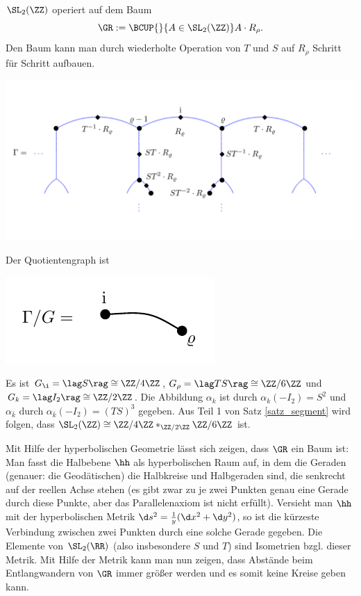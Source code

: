 \begin{enumerate}
$\SL_2(\ZZ)$ operiert auf dem Baum
\[
\GR := \BCUP{}{A\in\SL_2(\ZZ)} A\cdot R_{\rho}.
\]
Den Baum kann man durch wiederholte Operation von $T$ und $S$
auf $R_{\rho}$ Schritt für Schritt aufbauen.
\begin{center}
	\includegraphics[width=15cm]{grugraImages/Hbaum}
\end{center}
Der Quotientengraph ist
\begin{center}
	\includegraphics{grugraImages/rhoquot}
\end{center}
Es ist $G_{\i}=\lag S\rag \cong \ZZ/4\ZZ$,
$G_{\rho}=\lag TS\rag\cong \ZZ/6\ZZ$ und
$G_k=\lag I_2\rag \cong\ZZ/2\ZZ$.
Die Abbildung $\alpha_k$ ist durch $\alpha_k(-I_2)=S^2$ und
$\alpha_{\bar{k}}$ durch
$\alpha_{\bar{k}}(-I_2)=(TS)^3$ gegeben.
Aus Teil 1 von Satz \ref{satz_segment} wird folgen,
dass $\SL_2(\ZZ)\cong \ZZ/4\ZZ*_{\ZZ/2\ZZ} \ZZ/6\ZZ$ ist.

Mit Hilfe der hyperbolischen Geometrie lässt sich zeigen, dass
$\GR$ ein Baum ist:\\
Man fasst die Halbebene $\hh$ als hyperbolischen Raum auf, in dem
die Geraden (genauer: die Geodätischen) die Halbkreise und Halbgeraden
sind, die senkrecht auf der reellen Achse stehen (es gibt zwar
zu je zwei Punkten genau eine Gerade durch diese Punkte, aber
das Parallelenaxiom ist nicht erfüllt).
Versieht man $\hh$ mit der hyperbolischen Metrik
$\d s^2 = \frac{1}{y}(\d x^2 + \d y^2)$, so ist die kürzeste
Verbindung zwischen zwei Punkten durch eine solche Gerade gegeben.
Die Elemente von $\SL_2(\RR)$ (also insbesondere $S$ und $T$) sind
Isometrien bzgl. dieser Metrik. Mit Hilfe der Metrik kann man nun
zeigen, dass Abstände beim Entlangwandern von $\GR$ immer größer
werden und es somit keine Kreise geben kann.
\end{enumerate}


